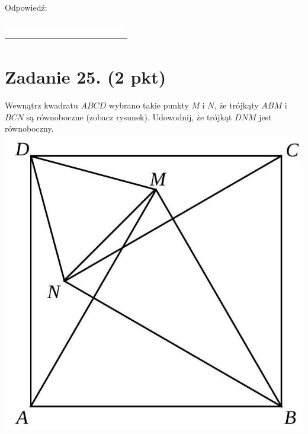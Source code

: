 \documentclass[10pt]{article}
\begin{document}
Odpowiedź: \(\qquad\)\\
\(\qquad\)\\
\includegraphics[max width=\textwidth, center]{2024_11_21_6438f6dbc3784fe6d1deg-09(2)}

\section*{Zadanie 25. (2 pkt)}
Wewnątrz kwadratu \(A B C D\) wybrano takie punkty \(M\) i \(N\), że trójkąty \(A B M\) i \(B C N\) są równoboczne (zobacz rysunek). Udowodnij, że trójkąt \(D N M\) jest równoboczny.\\
\includegraphics[max width=\textwidth, center]{2024_11_21_6438f6dbc3784fe6d1deg-10}\\
\end{document}
